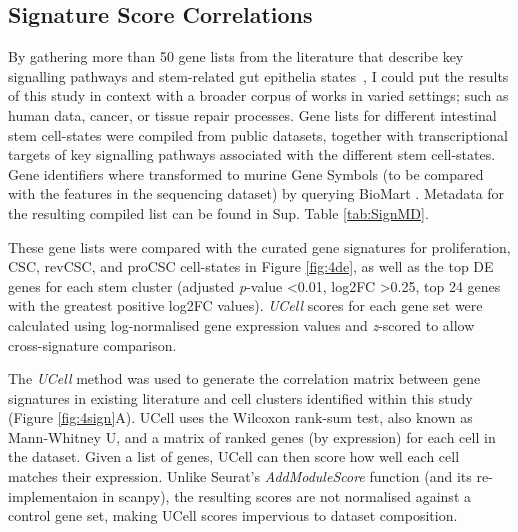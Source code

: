 \subsection{Signature Score Correlations}

By gathering more than 50 gene lists from the literature that describe key signalling pathways and stem-related gut epithelia states~\cite{ayyaz_single-cell_2019, vasquez_molecular_2022, alvarez-varela_mex3a_2022, mustata_identification_2013,  yui_yaptaz-dependent_2018, munoz_lgr5_2012, li_reference_2017, han_lineage_2020, merlos-suarez_intestinal_2011, dalerba_single-cell_2011, pelka_spatially_2021, gregorieff_yap-dependent_2015, canellas-socias_metastatic_2022, wang_comprehensive_2018, mourao_lineage_2019, barriga_mex3a_2017, bues_deterministic_2022, morral_zonation_2020}, I could put the results of this study in context with a broader corpus of works in varied settings; such as human data, cancer, or tissue repair processes.
Gene lists for different intestinal stem cell-states were compiled from public datasets, together with transcriptional targets of key signalling pathways associated with the different stem cell-states. Gene identifiers where transformed to murine Gene Symbols (to be compared with the features in the sequencing dataset) by querying BioMart \cite{smedley_biomart_2009}. Metadata for the resulting compiled list can be found in Sup. Table \ref{tab:SignMD}.

These gene lists were compared with the curated gene signatures for proliferation, CSC, revCSC, and proCSC cell-states in Figure \ref{fig:4de}, as well as the top DE genes for each stem cluster (adjusted \emph{p}-value \textless 0.01, log2FC \textgreater 0.25, top 24 genes with the greatest positive log2FC values). \textit{UCell} scores for each gene set were calculated using log-normalised gene expression values and \emph{z}-scored to allow cross-signature comparison.

The \textit{UCell} \cite{andreatta_ucell_2021} method was used to generate the correlation matrix between gene signatures in existing literature and cell clusters identified within this study (Figure \ref{fig:4sign}A). UCell uses the Wilcoxon rank-sum test, also known as Mann-Whitney U, and a matrix of ranked genes (by expression) for each cell in the dataset. Given a list of genes, UCell can then score how well each cell matches their expression. Unlike Seurat's \emph{AddModuleScore} function (and its re-implementaion in scanpy), the resulting scores are not normalised against a control gene set, making UCell scores impervious to dataset composition. 

